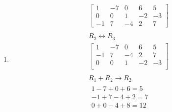 \documentclass[12pt letter]{report}
\begin{document}
{\begin{enumerate}
\begin{align*}
            -R_1                         \\
            \begin{bmatrix}
              1 & 3 & 0 & -5 \\
              0 & 0 & 1 & 3
            \end{bmatrix}               \\
            \\
            x_1 + 3x_2 = -5              \\
            x_3 = 3                      \\
            \\
            \begin{cases}
              x_1 = -5 -3x_2      \\
              x_2 \text{ is free} \\
              x_3 = 3             \\
            \end{cases}
          \end{align*}
    \item
          \begin{align*}
            \begin{bmatrix}
              1  & -7 & 0  & 6  & 5  \\
              0  & 0  & 1  & -2 & -3 \\
              -1 & 7  & -4 & 2  & 7
            \end{bmatrix}       \\
            \\
            R_2 \leftrightarrow R_3      \\
            \begin{bmatrix}
              1  & -7 & 0  & 6  & 5  \\
              -1 & 7  & -4 & 2  & 7  \\
              0  & 0  & 1  & -2 & -3 \\
            \end{bmatrix}       \\
            \\
            R_1 + R_2 \to R_2            \\
            \begin{split}
              1 - 7 + 0 + 6 = 5  \\
              -1 + 7 - 4 + 2 = 7 \\
              \hline
              0 + 0 - 4+ 8 = 12  \\
            \end{split}           \\

\end{align*}
\end{enumerate}}
\end{document}
